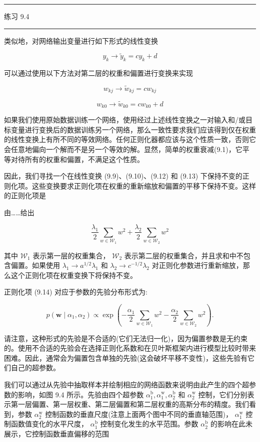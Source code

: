 \documentclass[10pt]{report}
\newcommand{\HRule}{\begin{center}\rule{0.9\linewidth}{0.2mm}\end{center}}
\begin{document}
\HRule

练习 9.4

\HRule

类似地，对网络输出变量进行如下形式的线性变换

\[
{y}_{k} \rightarrow  {\widetilde{y}}_{k} = c{y}_{k} + d \tag{9.11}
\]

可以通过使用以下方法对第二层的权重和偏置进行变换来实现

\[
{w}_{kj} \rightarrow  {\widetilde{w}}_{kj} = c{w}_{kj} \tag{9.12}
\]

\[
{w}_{k0} \rightarrow  {\widetilde{w}}_{k0} = c{w}_{k0} + d \tag{9.13}
\]

如果我们使用原始数据训练一个网络，使用经过上述线性变换之一对输入和/或目标变量进行变换后的数据训练另一个网络，那么一致性要求我们应该得到仅在权重的线性变换上有所不同的等效网络。任何正则化器都应该与这个性质一致，否则它会任意地偏向一个解而不是另一个等效的解。显然，简单的权重衰减(9.1)，它平等对待所有的权重和偏置，不满足这个性质。

因此，我们寻找一个在线性变换 (9.9)、(9.10)、(9.12) 和 (9.13) 下保持不变的正则化项。这些变换要求正则化项在权重的重新缩放和偏置的平移下保持不变。这样的正则化项是

由……给出

\[
\frac{{\lambda }_{1}}{2}\mathop{\sum }\limits_{{w \in  {\mathcal{W}}_{1}}}{w}^{2} + \frac{{\lambda }_{2}}{2}\mathop{\sum }\limits_{{w \in  {\mathcal{W}}_{2}}}{w}^{2} \tag{9.14}
\]

其中 \({\mathcal{W}}_{1}\) 表示第一层的权重集合， \({\mathcal{W}}_{2}\) 表示第二层的权重集合，并且求和中不包含偏置。如果使用 \({\lambda }_{1} \rightarrow  {a}^{1/2}{\lambda }_{1}\) 和 \({\lambda }_{2} \rightarrow  {c}^{-1/2}{\lambda }_{2}\) 对正则化参数进行重新缩放，那么这个正则化项在权重变换下将保持不变。

正则化项 (9.14) 对应于参数的先验分布形式为:

\[
p\left( {\mathbf{w} \mid  {\alpha }_{1},{\alpha }_{2}}\right)  \propto  \exp \left( {-\frac{{\alpha }_{1}}{2}\mathop{\sum }\limits_{{w \in  {\mathcal{W}}_{1}}}{w}^{2} - \frac{{\alpha }_{2}}{2}\mathop{\sum }\limits_{{w \in  {\mathcal{W}}_{2}}}{w}^{2}}\right) . \tag{9.15}
\]

请注意，这种形式的先验是不合适的(它们无法归一化)，因为偏置参数是无约束的。使用不合适的先验会在选择正则化系数和在贝叶斯框架内进行模型比较时带来困难。因此，通常会为偏置包含单独的先验(这会破坏平移不变性)，这些先验有它们自己的超参数。

我们可以通过从先验中抽取样本并绘制相应的网络函数来说明由此产生的四个超参数的影响，如图 9.4 所示。先验由四个超参数 \({\alpha }_{1}^{\mathrm{b}},{\alpha }_{1}^{\mathrm{w}},{\alpha }_{2}^{\mathrm{b}}\) 和 \({\alpha }_{2}^{\mathrm{w}}\) 控制，它们分别表示第一层偏置、第一层权重、第二层偏置和第二层权重的高斯分布的精度。我们看到，参数 \({\alpha }_{2}^{\mathrm{w}}\) 控制函数的垂直尺度(注意上面两个图中不同的垂直轴范围)， \({\alpha }_{1}^{\mathrm{w}}\) 控制函数值变化的水平尺度， \({\alpha }_{1}^{\mathrm{b}}\) 控制变化发生的水平范围。参数 \({\alpha }_{2}^{\mathrm{b}}\) 的影响在此未展示，它控制函数垂直偏移的范围
\end{document}
